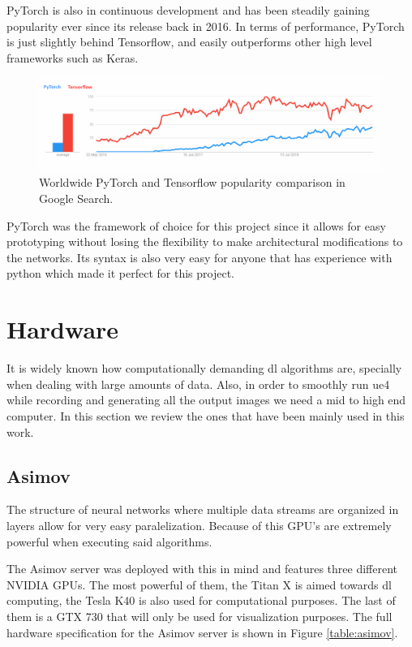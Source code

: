 PyTorch is also in continuous development and has been steadily gaining popularity ever since its release back in 2016. In terms of performance, PyTorch is just slightly behind Tensorflow, and easily outperforms other high level frameworks such as Keras.

\begin{figure}[h]
	\includegraphics[width=\textwidth]{archivos/pytorch.png}
	\centering
	\caption{Worldwide PyTorch and Tensorflow popularity comparison in Google Search.}
	\label{fig:pytorch}
\end{figure}

PyTorch was the framework of choice for this project since it allows for easy prototyping without losing the flexibility to make architectural modifications to the networks. Its syntax is also very easy for anyone that has experience with python which made it perfect for this project.

\section{Hardware}
It is widely known how computationally demanding \gls{dl} algorithms are, specially when dealing with large amounts of data. Also, in order to smoothly run \gls{ue4} while recording and generating all the output images we need a mid to high end computer. In this section we review the ones that have been mainly used in this work.

\subsection{Asimov}

The structure of neural networks where multiple data streams are organized in layers allow for very easy paralelization. Because of this GPU's are extremely powerful when executing said algorithms.

The Asimov server was deployed with this in mind and features three different NVIDIA GPUs. The most powerful of them, the Titan X is aimed towards \gls{dl} computing, the Tesla K40 is also used for computational purposes. The last of them is a GTX 730 that will only be used for visualization purposes. The full hardware specification for the Asimov server is shown in Figure \ref{table:asimov}.

